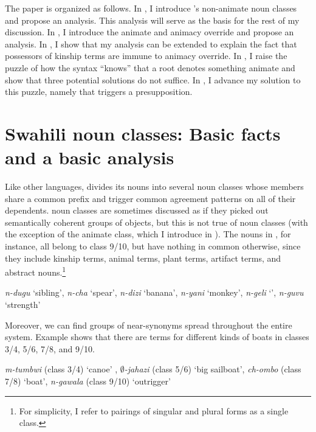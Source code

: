 \documentclass[output=paper,newtxmath,modfonts,nonflat,hidelinks]{langsci/langscibook}
\begin{document}
The paper is organized as follows.  In , I introduce 's non-animate noun classes and propose an analysis.  This analysis will serve as the basis for the rest of my discussion.  In , I introduce the animate  and animacy override and propose an analysis.  In , I show that my analysis can be extended to explain the fact that possessors of kinship terms are immune to animacy override.  In , I raise the puzzle of how the syntax ``knows'' that a root denotes something animate and show that three potential solutions do not suffice.  In , I advance my solution to this puzzle, namely that  triggers a presupposition.

\section{Swahili noun classes: Basic facts and a basic analysis}\label{snc:pesetsky:snc}

Like other  languages,  divides its nouns into several noun classes whose members share a common prefix and trigger common agreement patterns on all of their dependents.   noun classes are sometimes discussed as if they picked out semantically coherent groups of objects, but this is not true of  noun classes (with the exception of the animate class, which I introduce in ).  The nouns in , for instance, all belong to class 9/10, but have nothing in common otherwise, since they include kinship terms, animal terms, plant terms, artifact terms, and abstract nouns.\footnote{For simplicity, I refer to pairings of singular and plural forms as a single class.}

\ea\label{ex:pesetsky:deadstuff}{ \textit{n-dugu} `sibling', \textit{n-cha} `spear', \textit{n-dizi} `banana', \textit{n-yani} `monkey', \textit{n-geli} `', \textit{n-guvu} `strength' } \z

Moreover, we can find groups of near-synonyms spread throughout the entire   system. Example  shows that there are terms for different kinds of boats in classes 3/4, 5/6, 7/8, and 9/10.

\ea\label{ex:pesetsky:boats} \textit{m-tumbwi} (class 3/4) `canoe' , \textit{$\emptyset$-jahazi} (class 5/6) `big sailboat', \textit{ch-ombo} (class 7/8) `boat', \textit{n-gawala} (class 9/10) `outrigger'  \z 
\end{document}
